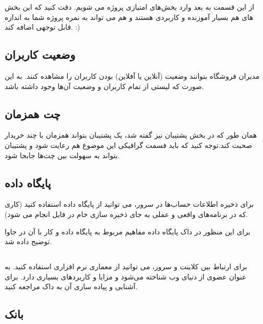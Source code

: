 \documentclass[]{article}
\begin{document}
از این قسمت به بعد وارد بخش‌های امتیازی پروژه می شویم. دقت کنید که این بخش های هم بسیار آموزنده و کاربردی هستند و هم می تواند به نمره پروژه شما به اندازه قابل توجهی اضافه کند. :)


\subsection*{{\titr وضعیت کاربران}}

مدیران فروشگاه بتوانند وضعیت (‌آنلاین یا آفلاین) بودن کاربران را مشاهده کنند. به این صورت که لیستی از تمام کاربران و وضعیت آن‌ها وجود داشته باشد.

\subsection*{{\titr چت همزمان}}

همان طور که در بخش پشتیبان نیز گفته شد،‌ یک پشتیبان بتواند همزمان با چند خریدار صحبت کند.توجه کنید که باید فسمت گرافیکی این موضوع هم رعایت شود و پشتیبان بتواند به سهولت بین چت‌ها جابجا شود.


\subsection*{{\titr پایگاه داده}}


برای ذخیره اطلاعات حساب‌ها در سرور، می توانید از پایگاه داده استفاده کنید (‌کاری که در برنامه‌های واقعی و عملی به جای ذخیره سازی خام در فایل انجام می شود).


برای این منظور در \textcolor{CustomColor}{داک پایگاه داده} مفاهیم مربوط به پایگاه داده و کار با آن در جاوا توضیح داده شد.



\subsection*{{}}

برای ارتباط بین کلاینت و سرور،‌ می توانید از معماری نرم افزاری  استفاده کنید.  به عنوان عضوی از دنیای وب شناخته می‌شود و مزایا و کاربردهای بسیاری دارد. برای آشنایی و پیاده سازی آن به داک  مراجعه کنید.




\subsection*{{\titr بانک}}
\end{document}

